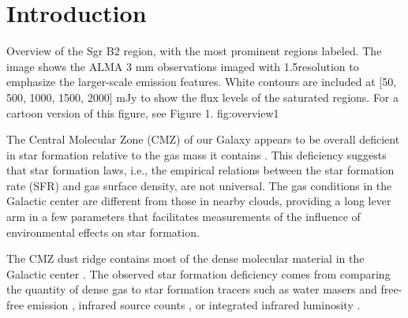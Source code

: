 \documentclass[twocolumn]{aastex61}
\begin{document}
\section{Introduction}

{Overview of the Sgr B2 region, with the most prominent regions labeled.
The image shows the ALMA 3 mm observations imaged with 1.5\arcsec resolution
to emphasize the larger-scale emission features.  White contours
are included at [50, 500, 1000, 1500, 2000] mJy \perbeam to show the flux levels
of the saturated regions.  For a cartoon version of this
figure, see \citet{Schmiedeke2016a} Figure 1.}
{fig:overview}{1}{\textwidth}

The Central Molecular Zone (CMZ) of our Galaxy appears to be overall deficient
in star formation relative to the gas mass it contains
\citep{Guesten1983b,Morris1996a,Beuther2012a,Immer2012a,Longmore2013b,
Kauffmann2017c,Kauffmann2017b,Barnes2017b}.  This deficiency
suggests that star formation laws, i.e., the empirical relations between
the star formation rate (SFR) and gas surface density, are not universal.  The gas
conditions in the Galactic center are different from those in nearby clouds,
providing a long lever arm in a few
parameters \citep[e.g., pressure, temperature, velocity
dispersion;
][]{Kruijssen2013a,Ginsburg2016a,Immer2016a,Shetty2012a,Henshaw2016a} that
facilitates measurements of the influence of environmental effects on star
formation.

The CMZ dust ridge contains most of the dense molecular material in the
Galactic center \citep{Lis2001a,Bally2010a,Molinari2011a}.  The observed star
formation deficiency comes from comparing the quantity of dense gas to  star
formation tracers such as water masers and free-free emission
\citep{Longmore2013b}, infrared source counts \citep{Yusef-Zadeh2009a}, or
integrated infrared luminosity \citep{Barnes2017b}. 
\end{document}
